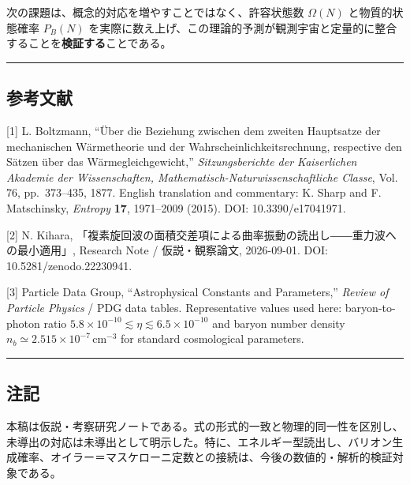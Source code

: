 \documentclass[
  a4paper,
]{ltjsarticle}
\begin{document}
次の課題は、概念的対応を増やすことではなく、許容状態数 \(\Omega(N)\)
と物質的状態確率 \(P_B(N)\)
を実際に数え上げ、この理論的予測が観測宇宙と定量的に整合することを\textbf{検証する}ことである。

\begin{center}\rule{0.5\linewidth}{0.5pt}\end{center}

\subsection{参考文献}\label{ux53c2ux8003ux6587ux732e}

{[}1{]} L. Boltzmann, ``Über die Beziehung zwischen dem zweiten
Hauptsatze der mechanischen Wärmetheorie und der
Wahrscheinlichkeitsrechnung, respective den Sätzen über das
Wärmegleichgewicht,'' \emph{Sitzungsberichte der Kaiserlichen Akademie
der Wissenschaften, Mathematisch-Naturwissenschaftliche Classe}, Vol.
76, pp.~373--435, 1877. English translation and commentary: K. Sharp and
F. Matschinsky, \emph{Entropy} \textbf{17}, 1971--2009 (2015). DOI:
10.3390/e17041971.

{[}2{]} N. Kihara,
「複素旋回波の面積交差項による曲率振動の読出し――重力波への最小適用」,
Research Note / 仮説・観察論文, 2026-09-01. DOI:
10.5281/zenodo.22230941.

{[}3{]} Particle Data Group, ``Astrophysical Constants and Parameters,''
\emph{Review of Particle Physics} / PDG data tables. Representative
values used here: baryon-to-photon ratio
\(5.8\times10^{-10}\lesssim\eta\lesssim6.5\times10^{-10}\) and baryon
number density \(n_b\simeq2.515\times10^{-7}\,\mathrm{cm}^{-3}\) for
standard cosmological parameters.

\begin{center}\rule{0.5\linewidth}{0.5pt}\end{center}

\subsection{注記}\label{ux6ce8ux8a18}

本稿は仮説・考察研究ノートである。式の形式的一致と物理的同一性を区別し、未導出の対応は未導出として明示した。特に、エネルギー型読出し、バリオン生成確率、オイラー＝マスケローニ定数との接続は、今後の数値的・解析的検証対象である。
\end{document}
